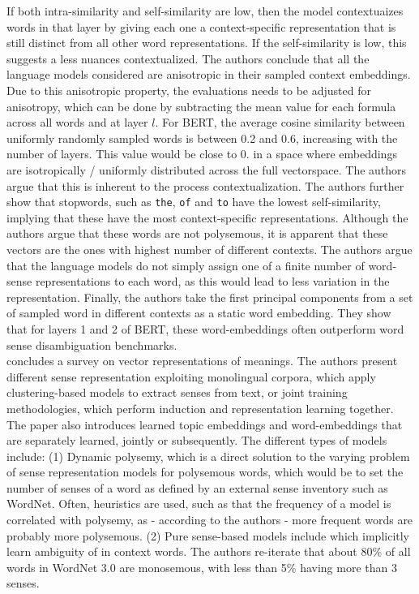 \documentclass[a4paper,12pt,twoside,openright]{report}
\begin{document}
If both intra-similarity and self-similarity are low, then the model contextuaizes words in that layer by giving each one a context-specific representation that is still distinct from all other word representations.
If the self-similarity is low, this suggests a less nuances contextualized.
The authors conclude that all the language models considered are anisotropic in their sampled context embeddings.
Due to this anisotropic property, the evaluations needs to be adjusted for anisotropy, which can be done by subtracting the mean value for each formula across all words and at layer $l$. 
For BERT, the average cosine similarity between uniformly randomly sampled words is between 0.2 and 0.6, increasing with the number of layers.
This value would be close to 0. in a space where embeddings are isotropically / uniformly distributed across the full vectorspace.
The authors argue that this is inherent to the process contextualization.
The authors further show that stopwords, such as \texttt{the}, \texttt{of} and \texttt{to} have the lowest self-similarity, implying that these have the most context-specific representations.
Although the authors argue that these words are not polysemous, it is apparent that these vectors are the ones with highest number of different contexts.
The authors argue that the language models do not simply assign one of a finite number of word-sense representations to each word, as this would lead to less variation in the representation.
Finally, the authors take the first principal components from a set of sampled word in different contexts as a static word embedding. 
They show that for layers 1 and 2 of BERT, these word-embeddings often outperform word sense disambiguation benchmarks.
\\

\cite{camachocollados18} concludes a survey on vector representations of meanings.
The authors present different sense representation exploiting monolingual corpora, which apply clustering-based models to extract senses from text, or joint training methodologies, which perform induction and representation learning together.
The paper also introduces learned topic embeddings and word-embeddings that are separately learned, jointly or subsequently.
The different types of models include: 
(1) Dynamic polysemy, which is a direct solution to the varying  problem of sense representation models for polysemous words, which would be to set the number of senses of a word as defined by an external sense inventory such as WordNet. 
Often, heuristics are used, such as that the frequency of a model is correlated with polysemy, as - according to the authors - more frequent words are probably more polysemous.
(2) Pure sense-based models include which implicitly learn ambiguity of in context words.
The authors re-iterate that about 80\% of all words in WordNet  3.0 are monosemous, with less than 5\% having more than 3 senses. \\
\end{document}
